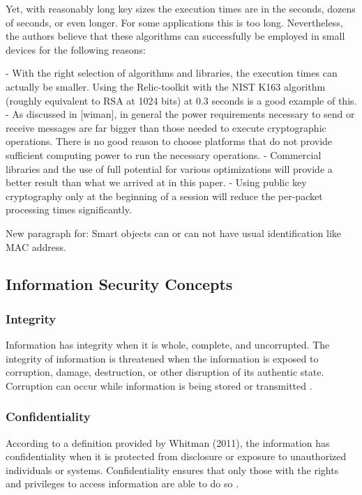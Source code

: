 \documentclass[letterpaper,conference]{IEEEtran}
\begin{document}
Yet, with reasonably long key sizes the execution times are in the seconds, dozens of seconds, or even 
longer.  For some applications this is too long.  Nevertheless, the authors believe that these algorithms 
can successfully be employed in small devices for the following reasons:

- With the right selection of algorithms and libraries, the execution times can actually be smaller.  Using the Relic-toolkit
with the NIST K163 algorithm (roughly equivalent to RSA at 1024 bits) at 0.3 seconds is a good example of this.
- As discussed in [wiman], in general the power requirements necessary to send or receive messages are far bigger than those
needed to execute cryptographic operations.  There is no good reason to choose platforms that do not provide sufficient 
computing power to run the necessary operations.
- Commercial libraries and the use of full potential for various optimizations will provide a better result than what
we arrived at in this paper.
- Using public key cryptography only at the beginning of a session will reduce the per-packet processing 
times significantly.

\cite{garcia2013security}

New paragraph for: Smart objects can or can not have usual identification like MAC address.

\subsection{Information Security Concepts}
\subsubsection{Integrity}
Information has integrity when it is whole, complete, and uncorrupted. The
integrity of information is threatened when the information is exposed to corruption, damage, destruction, or other 
disruption of its authentic state. Corruption can occur while
information is being stored or transmitted \cite{whitman2011principles}.

\subsubsection{Confidentiality}

According to a definition provided by Whitman (2011), the information has confidentiality when it is 
protected from disclosure or exposure to unauthorized individuals or systems. Confidentiality ensures that only 
those with the rights and privileges to access information are able to do so \cite{whitman2011principles}.
\end{document}
